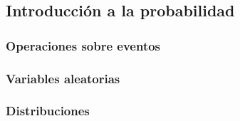 \documentclass[../main.tex]{subfiles}
\begin{document}
\subsection{Introducción a la probabilidad}

\subsubsection{Operaciones sobre eventos}
\subsubsection{Variables aleatorias}
\subsubsection{Distribuciones}
\end{document}
